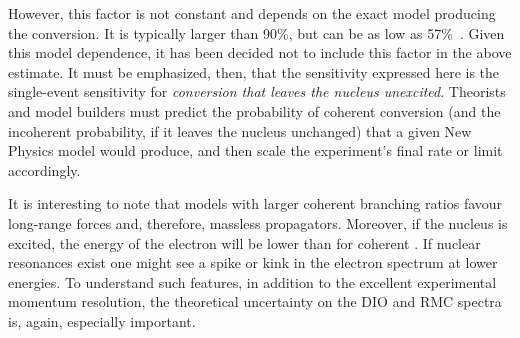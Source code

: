 However, this factor is not constant and depends on the exact model producing the conversion.  
It is typically larger than 90\%, but can be as low as 57\%~\cite{Siiskonen:1999pj}.
Given this model dependence, it has been decided not to include this factor in the above estimate.  It must be emphasized, then, that the sensitivity expressed here is the single-event sensitivity for \emph{conversion that leaves the nucleus unexcited}.
Theorists and model builders must predict the probability of coherent conversion (and the incoherent probability, if it leaves the nucleus unchanged) that a given New Physics model would produce, and then scale the experiment's final rate or limit accordingly.

It is interesting to note that models with larger coherent branching ratios favour long-range forces and, therefore, massless propagators.
Moreover, if the nucleus is excited, the energy of the electron will be lower than for coherent \mueconv.
If nuclear resonances exist one might see a spike or kink in the electron spectrum at lower energies.
To understand such features, in addition to the excellent experimental momentum resolution, the theoretical uncertainty on the \ac{DIO} and \ac{RMC} spectra is, again, especially important.
